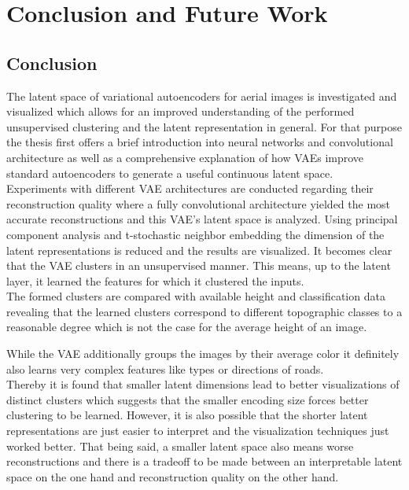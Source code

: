 \section{Conclusion and Future Work}
\subsection{Conclusion}

The latent space of variational autoencoders for aerial images is investigated and visualized 
which allows for an improved understanding of the performed unsupervised clustering and the 
latent representation in general. For that purpose the thesis first offers a brief introduction
into neural networks and convolutional architecture as well as a comprehensive explanation 
of how VAEs improve standard autoencoders to generate a useful continuous latent space.\\ 

Experiments with different VAE architectures are conducted regarding their reconstruction quality where a fully
convolutional architecture yielded the most accurate reconstructions and this VAE's latent space is analyzed.
Using principal component analysis and t-stochastic neighbor embedding the dimension of the latent representations
is reduced and the results are visualized. It becomes clear that the VAE clusters in an unsupervised manner.
This means, up to the latent layer, it learned the features for which it clustered the inputs.\\

The formed clusters are compared with available height and classification data revealing that the learned clusters
correspond to different topographic classes to a reasonable degree which is not the case for the average height of
an image. 

While the VAE additionally groups the images by their average color it definitely also learns very complex features 
like types or directions of roads.\\

Thereby it is found that smaller latent dimensions lead to better visualizations of distinct clusters which suggests
that the smaller encoding size forces better clustering to be learned. However, it is also possible that the 
shorter latent representations are just easier to interpret and the visualization techniques just worked better.
That being said, a smaller latent space also means worse reconstructions and there is a tradeoff to be made between
an interpretable latent space on the one hand and reconstruction quality on the other hand.


